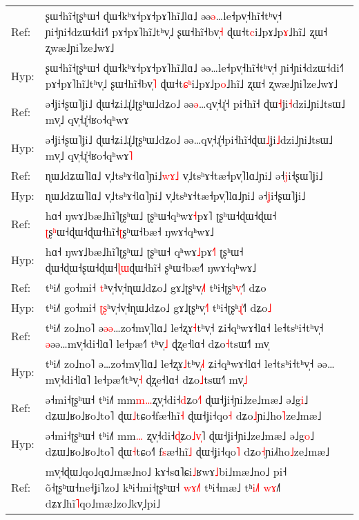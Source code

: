 \documentclass[10pt]{article}
\DeclareRobustCommand{\hl}[1]{{\textcolor{red}{#1}}}
\begin{document}
\begin{longtable}{ll}
\midrule 
Ref: & ʂɯ˧hĩ˧ʈʂʰɯ˧ ɖɯ˧kʰɤ˧pɤ˧pɤ˥hĩ˩lɑ˩ əə\hl{ə}…le˧pv̩˧hĩ˧tʰv̩˧ ɲi˧ɲi˧dzɯ˧di˧˥ pɤ˧pɤ˥hĩ˩tʰv̩˩ ʂɯ˧hĩ˧bv̩\hl{˧} ɖɯ˧t\hl{c}i˩pɤ˩p\hl{ɤ}˩hĩ˩ ʐɯ˧ ʐwæ˩ɲi˥ze˩wɤ˩ \\ 
Hyp: & ʂɯ˧hĩ˧ʈʂʰɯ˧ ɖɯ˧kʰɤ˧pɤ˧pɤ˥hĩ˩lɑ˩ əə…le˧pv̩˧hĩ˧tʰv̩˧ ɲi˧ɲi˧dzɯ˧di˧˥ pɤ˧pɤ˥hĩ˩tʰv̩˩ ʂɯ˧hĩ˧bv̩\hl{˥} ɖɯ˧t\hl{ɕ}\hl{ʰ}i˩pɤ˩p\hl{o}˩hĩ˩ ʐɯ˧ ʐwæ˩ɲi˥ze˩wɤ˩ \\ 
\midrule 
Ref: & ə˧ʝi˧ʂɯ˥ʝi˩ ɖɯ˧ʑi˩ɻ̍˩ʈʂʰɯ˩dʑo˩ əə\hl{ə}…qv̩˧ɻ̍˧\hl{ }pi˧hĩ˧\hl{ }ɖɯ\hl{˧}ʝi\hl{˧}dzi˩ɲi˩tsɯ˩ mv̩˩ qv̩˧ɻ̍˧ʁo˧qʰwɤ \\ 
Hyp: & ə˧ʝi˧ʂɯ˥ʝi˩ ɖɯ˧ʑi˩ɻ̍˩ʈʂʰɯ˩dʑo˩ əə…qv̩˧ɻ̍˧pi˧hĩ˧ɖɯ\hl{˩}ʝi\hl{˩}dzi˩ɲi˩tsɯ˩ mv̩˩ qv̩˧ɻ̍˧ʁo˧qʰwɤ\hl{˥} \\ 
\midrule 
Ref: & ɳɯ˩dʑɯ˥lɑ˩ v̩˩tsʰɤ˧lɑ˥ɲi˩\hl{w}\hl{ɤ}\hl{˩} v̩˩tsʰɤ˧tæ˧pv̩˥lɑ˩ɲi˩ ə˧\hl{j}i˧ʂɯ˥ʝi˩ \\ 
Hyp: & ɳɯ˩dʑɯ˥lɑ˩ v̩˩tsʰɤ˧lɑ˥ɲi˩ v̩˩tsʰɤ˧tæ˧pv̩˥lɑ˩ɲi˩ ə˧\hl{ʝ}i˧ʂɯ˥ʝi˩ \\ 
\midrule 
Ref: & hɑ˧ ŋwɤ˩bæ˩hĩ˥ʈʂʰɯ˩ ʈʂʰɯ˧qʰwɤ\hl{˧}pɤ˥ ʈʂʰɯ˧ɖɯ˧ɖɯ˧\hl{ }\hl{ʈ}ʂ\hl{ʰ}ɯ˧ɖɯ˧ɖɯ˧hĩ˧\hl{ʈ}ʂʰɯ˧bæ˧ ŋwɤ˧qʰwɤ˩ \\ 
Hyp: & hɑ˧ ŋwɤ˩bæ˩hĩ˥ʈʂʰɯ˩ ʈʂʰɯ˧\hl{ }qʰwɤ\hl{˩}pɤ\hl{˧}˥ ʈʂʰɯ˧\hl{ }ɖɯ˧ɖɯ˧ʂɯ˧ɖɯ˧\hl{ɭ}\hl{ɯ}ɖɯ˧hĩ˧\hl{ }ʂʰɯ˧bæ˧\hl{˥} ŋwɤ˧qʰwɤ˩ \\ 
\midrule 
Ref: & tʰi˩˥ go˧mi˧ \hl{t}ʰv̩˧v̩˧ɳɯ˩dʑo˩ gɤ˩ʈʂʰv̩\hl{˩}˥ tʰi˧ʈʂʰ\hl{v}\hl{̩}˧˥ dʑo \\ 
Hyp: & tʰi˩˥ go˧mi˧ \hl{ʈ}\hl{ʂ}ʰv̩˧v̩˧ɳɯ˩dʑo˩ gɤ˩ʈʂʰv̩\hl{˧}˥ tʰi˧ʈʂʰ\hl{ɻ}\hl{̍}˧˥ dʑo\hl{˩} \\ 
\midrule 
Ref: & tʰi˩˥ zo˩no˥ ə\hl{ə}\hl{ə}…zo˧mv̩˥lɑ˩ le˧ʐɤ\hl{˧}tʰv̩˧ ʑi˧qʰwɤ˧lɑ˧ le˧tsʰi˧tʰv̩˧ \hl{ə}əə…mv̩˧di˧lɑ˥ le˧pæ˧˥\hl{ }tʰv̩\hl{˩} ɖʐe˧lɑ˧ dʑo\hl{˧}tsɯ˧˥ mv̩ \\ 
Hyp: & tʰi˩˥ zo˩no˥ ə…zo˧mv̩˥lɑ˩ le˧ʐɤ\hl{˩}tʰv̩\hl{˩}˧ ʑi˧qʰwɤ˧lɑ˧ le˧tsʰi˧tʰv̩˧ əə…mv̩˧di˧lɑ˥ le˧pæ˧˥tʰv̩\hl{˧} ɖʐe˧lɑ˧ dʑo\hl{˩}tsɯ˧˥ mv̩\hl{˩} \\ 
\midrule 
Ref: & ə˧mi˧ʈʂʰɯ˧ tʰi˩˥ mm\hl{m}\hl{…}ʐv̩˧di˧\hl{d}ʑo\hl{˧}˥ ɖɯ˧ʝi˧ɲi˩ze˩mæ˩ ə˩g\hl{i}˩ dʑɯ˩ʁo˩ʁo˩to˥ ɖɯ\hl{˩}tɕo˧fæ˧hĩ\hl{˧} ɖɯ˧ʝi˧qo\hl{˧} dʑo\hl{˩}ɲi˩ho\hl{˥}ze˩mæ˩ \\ 
Hyp: & ə˧mi˧ʈʂʰɯ˧ tʰi˩˥ mm\hl{…}\hl{ }ʐv̩˧di˧\hl{ɖ}ʑo\hl{˩}\hl{v}\hl{̩}˥ ɖɯ˧ʝi˧ɲi˩ze˩mæ˩ ə˩g\hl{o}˩ dʑɯ˩ʁo˩ʁo˩to˥ ɖɯ\hl{˧}tɕo˧\hl{˥}\hl{ }f\hl{s}æ˧hĩ\hl{˩} ɖɯ˧ʝi˧qo\hl{˥} dʑo\hl{˧}ɲi˩\hl{˧}ho\hl{˩}ze˩mæ˩ \\ 
\midrule 
Ref: & mv̩˧ɖɯ˩qo˩qɑ˩mæ˩no˩ kɤ˧sɑ˥ɕi\hl{˩}ʁwɤ\hl{˩}bi˩mæ˩no˩ pi˧ õ˧ʈʂʰɯ˧ne˧ʝi˥zo˩ kʰi˧mi˧ʈʂʰɯ˧\hl{ }\hl{w}\hl{ɤ}\hl{˩}\hl{˥} tʰi˧mæ˩\hl{ }tʰ\hl{i}\hl{˩}\hl{˥}\hl{ }\hl{w}\hl{ɤ}˩˥ dʑɤ˩hĩ\hl{˥}qo˩mæ˩zo˩kv̩˩pi˩ \\ 

\end{longtable}
\end{document}
